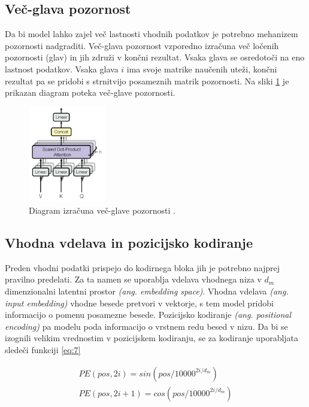 \documentclass[a4paper,12pt,openright]{book}
\begin{document}
\subsection{Več-glava pozornost}
Da bi model lahko zajel več lastnosti vhodnih podatkov je potrebno mehanizem pozornosti nadgraditi. Več-glava pozornost vzporedno izračuna več ločenih pozornosti (glav) in jih združi v končni rezultat. Vsaka glava se osredotoči na eno lastnost podatkov. Vsaka glava $ i $ ima svoje matrike naučenih uteži, končni rezultat pa se pridobi s strnitvijo posameznih matrik pozornosti. Na sliki \ref{img:mha} je prikazan diagram poteka več-glave pozornosti.

\begin{figure}[htb]
    \begin{center}
        \includegraphics[width=0.3\textwidth]{img/mha.png}
    \end{center}
    \caption{Diagram izračuna več-glave pozornosti \cite{attention_is_all_you_need}.}
    \label{img:mha}
\end{figure}


\subsection{Vhodna vdelava in pozicijsko kodiranje}
Preden vhodni podatki prispejo do kodirnega bloka jih je potrebno najprej pravilno predelati. Za ta namen se uporablja vdelava vhodnega niza v $ d_m $ dimenzionalni latentni prostor \emph{(ang. embedding space)}. Vhodna vdelava \emph{(ang. input embedding)} vhodne besede pretvori v vektorje, s tem model pridobi informacijo o pomenu posamezne besede. Pozicijsko kodiranje \emph{(ang. positional encoding)} pa modelu poda informacijo o vrstnem redu besed v nizu. Da bi se izognili velikim vrednostim v pozicijskem kodiranju, se za kodiranje uporabljata sledeči funkciji \ref{eq:7}

\begin{equation}
    \begin{split}
        PE(pos, 2i) = sin(pos/10000^{2i/d_m}) \\
        PE(pos, 2i+1) = cos(pos/10000^{2i/d_m})
    \end{split}
    \label{eq:7}
\end{equation}
\end{document}
